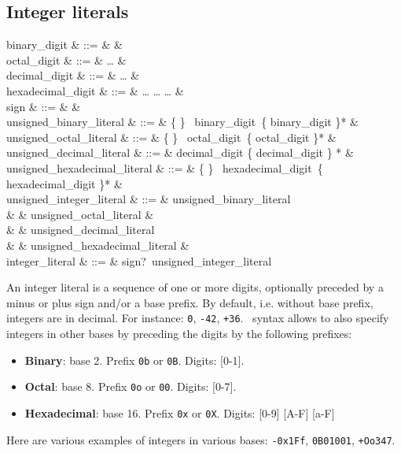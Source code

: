\subsection{Integer literals}
\label{integer literals}
\label{octal}
\label{hexadecimal}
\label{binary}
\begin{syntax}
binary\_digit & ::= &  \mid {} & \\
octal\_digit & ::= &  \ldots {} & \\
decimal\_digit & ::= &  \ldots {} & \\
hexadecimal\_digit & ::= &  \ldots {}
       \mid {} \ldots {}
       \mid {} \ldots {} & \\
sign & ::= & \terminal{+} \mid \terminal{-} & \\
unsigned\_binary\_literal & ::= &
   \{  \mid {} \}
  \ binary\_digit\ \{ binary\_digit \mid \terminal{\_} \}* & \\
unsigned\_octal\_literal & ::= &
   \{  \mid {} \}
  \ octal\_digit\ \{ octal\_digit \mid \terminal{\_} \}* & \\
unsigned\_decimal\_literal & ::= &
  decimal\_digit \{ decimal\_digit \mid \terminal{\_} \} * & \\
unsigned\_hexadecimal\_literal & ::= &
   \{  \mid {} \}
  \ hexadecimal\_digit\ \{ hexadecimal\_digit \mid \terminal{\_} \}* & \\
unsigned\_integer\_literal & ::= & unsigned\_binary\_literal \\
& & \mid unsigned\_octal\_literal & \\
& & \mid unsigned\_decimal\_literal \\
& & \mid unsigned\_hexadecimal\_literal & \\
integer\_literal & ::= & sign?\ unsigned\_integer\_literal
\end{syntax}

An integer literal is a sequence of one or more digits, optionally
preceded by a minus or plus sign and/or a base prefix. By default,
i.e. without base prefix, integers are in decimal. For instance:
{\tt 0}, {\tt -42}, {\tt +36}. \focal\ syntax allows to also specify
integers in other bases by preceding the digits by the following
prefixes:
\begin{itemize}
  \item {\bf Binary}: base 2. Prefix {\tt 0b} or {\tt 0B}.
    Digits: [0-1].
  \item {\bf Octal}: base 8. Prefix {\tt 0o} or {\tt 00}.
    Digits: [0-7].
  \item {\bf Hexadecimal}: base 16. Prefix {\tt 0x} or {\tt 0X}.
    Digits: [0-9] [A-F] [a-F]
\end{itemize}
Here are various examples of integers in various bases:
{\tt -0x1Ff}, {\tt 0B01001}, {\tt +Oo347}.



